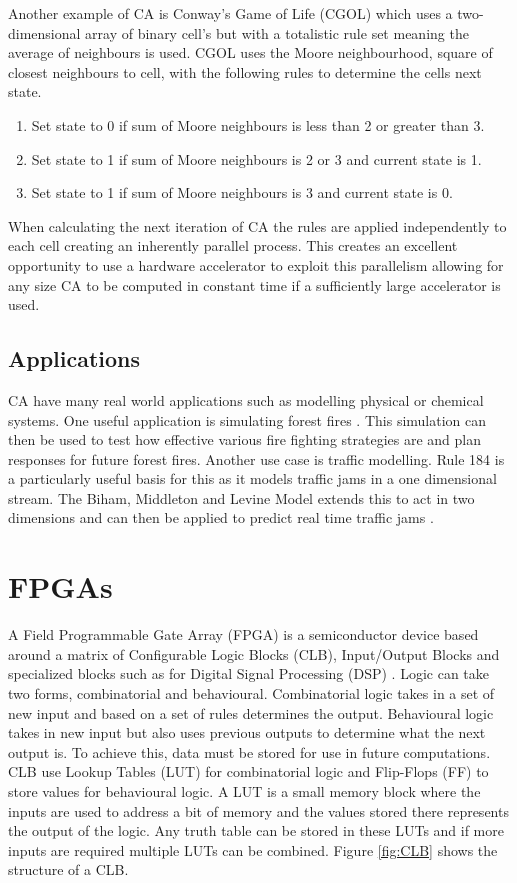 Another example of CA is Conway’s Game of Life (CGOL) \cite{GARDNER1970} which uses a two\mbox{-}dimensional array of binary cell’s but with a totalistic rule set meaning the average of neighbours is used. CGOL uses the Moore neighbourhood, square of closest neighbours to cell, with the following rules to determine the cells next state.

\begin{enumerate}
	\item Set state to 0 if sum of Moore neighbours is less than 2 or greater than 3.
	\item Set state to 1 if sum of Moore neighbours is 2 or 3 and current state is 1.
	\item Set state to 1 if sum of Moore neighbours is 3 and current state is 0.
\end{enumerate}

When calculating the next iteration of CA the rules are applied independently to each cell creating an inherently parallel process. This creates an excellent opportunity to use a hardware accelerator to exploit this parallelism allowing for any size CA to be computed in constant time if a sufficiently large accelerator is used.

\subsection{Applications}
CA have many real world applications such as modelling physical or chemical systems. One useful application is simulating forest fires \cite{MUTTHULAKSHMI2020}. This simulation can then be used to test how effective various fire fighting strategies are and plan responses for future forest fires. Another use case is traffic modelling. Rule 184 is a particularly useful basis for this as it models traffic jams in a one dimensional stream. The Biham, Middleton and Levine Model extends this to act in two dimensions and can then be applied to predict real time traffic jams \cite{HU2017}.

\section{FPGAs}
A Field Programmable Gate Array (FPGA) is a semiconductor device based around a matrix of Configurable Logic Blocks (CLB), Input/Output Blocks and specialized blocks such as for Digital Signal Processing (DSP) \cite{XILINXARCH}. Logic can take two forms, combinatorial and behavioural. Combinatorial logic takes in a set of new input and based on a set of rules determines the output. Behavioural logic takes in new input but also uses previous outputs to determine what the next output is. To achieve this, data must be stored for use in future computations. CLB use Lookup Tables (LUT) for combinatorial logic and Flip\mbox{-}Flops (FF) to store values for behavioural logic. A LUT is a small memory block where the inputs are used to address a bit of memory and the values stored there represents the output of the logic. Any truth table can be stored in these LUTs and if more inputs are required multiple LUTs can be combined. Figure \ref{fig:CLB} shows the structure of a CLB.

